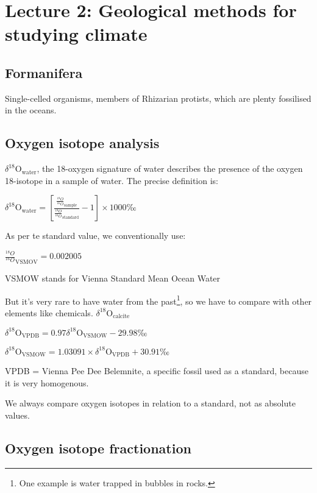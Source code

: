 \section{Lecture 2: Geological methods for studying climate}

\subsection{Formanifera}

Single-celled organisms, members of Rhizarian protists, which are plenty
fossilised in the oceans.

\subsection{Oxygen isotope analysis}

$\delta^{18}$O$_{\text{water}}$, the 18-oxygen signature of water describes the
presence of the oxygen 18-isotope in a sample of water. The precise definition
is:

$
\delta^{18}\text{O}_{\text{water}} = 
\left[
\frac{
	\frac{{}^{18}O}{{}^{16}O}_{\text{sample}}
}{
	\frac{{}^{18}O}{{}^{16}O}_{\text{standard}}
}
-1
\right] \times 1000$‰

As per te standard value, we conventionally use:

$\frac{{}^{18}O}{{}^{16}O}_{\text{VSMOV}} = 0.002005$

VSMOW stands for Vienna Standard Mean Ocean Water

But it's very rare to have water from the past\footnote{
	One example is water trapped in bubbles in rocks.
}, so we have to compare with other elements like chemicals.
$\delta^{18}\text{O}_{\text{calcite}}$

$\delta^{18}\text{O}_{\text{VPDB}}
= 0.97 \delta^{18}\text{O}_{\text{VSMOW}} - 29.98 \text{‰}$

$\delta^{18}\text{O}_{\text{VSMOW}} = 1.03091 \times 
\delta^{18}\text{O}_{\text{VPDB}} + 30.91 \text{‰}$

VPDB = Vienna Pee Dee Belemnite, a specific fossil used as a standard, because
it is very homogenous.

We always compare oxygen isotopes in relation to a standard, not as absolute
values.

\subsection{Oxygen isotope fractionation}

